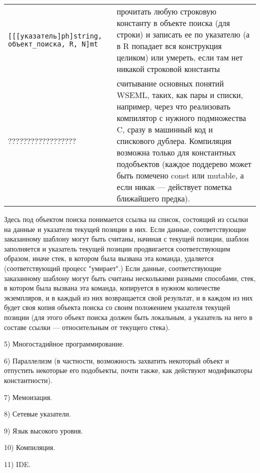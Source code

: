 \documentclass{report}
\begin{document}
\begin{center}
\begin{tabular}{|l|p{10cm}|}
        \verb|[[[указатель]ph]string, объект_поиска, R, N]mt|&прочитать любую строковую константу в объекте поиска (для строки) и записать ее по указателю (а в R попадает вся конструкция целиком) или умереть, если там нет никакой строковой константы\\
        ??????????????????&считывание основных понятий WSEML, таких, как пары и списки, например, через что реализовать компилятор с нужного подмножества C, сразу в машинный код и спискового дублера. Компиляция возможна только для константных подобъектов (каждое поддерево может быть помечено const или mutable, а если никак --- действует пометка ближайшего предка).\\
        \hline
    \end{tabular}
    \end{center}
    Здесь под объектом поиска понимается ссылка на список, состоящий из ссылки на данные и указателя текущей позиции в них. Если данные, соответствующие заказанному шаблону могут быть считаны, начиная с текущей позиции, шаблон заполняется и указатель текущей позиции продвигается соответствующим образом, иначе стек, в котором была вызвана эта команда, удаляется (соответствующий процесс "умирает"\relax.) Если данные, соответствующие заказанному шаблону могут быть считаны несколькими разными способами, стек, в котором была вызвана эта команда, копируется в нужном количестве экземпляров, и в каждый из них возвращается свой результат, и в каждом из них будет своя копия объекта поиска со своим положением указателя текущей позиции (для этого объект поиска должен быть локальным, а указатель на него в составе ссылки --- относительным от текущего стека).

    5) Многостадийное программирование.

    6) Параллелизм (в частности, возможность захватить некоторый объект и отпустить некоторые его подобъекты, почти также, как действуют модификаторы константности).

    7) Мемоизация.

    8) Сетевые указатели.

    9) Язык высокого уровня.

    10) Компиляция.

    11) IDE.
\end{document}
